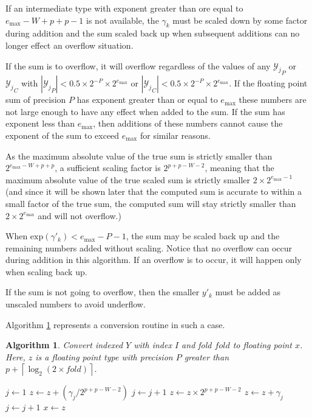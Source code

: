 \documentclass[12pt]{article}
\providecommand{\ceil}[1]{\left \lceil #1 \right \rceil }
\providecommand{\exp}{\ensuremath{\text{exp}}}
\providecommand{\max}{\ensuremath{\text{max}}}
\theoremstyle{plain}
\newtheorem{alg}{Algorithm}[section]
\begin{document}
    If an intermediate type with exponent greater than ore equal to $e_{\max} - W + p + p - 1$ is not available, the $\gamma_k$ must be scaled down by some factor during addition and the sum scaled back up when subsequent additions can no longer effect an overflow situation.

    If the sum is to overflow, it will overflow regardless of the values of any ${\mathcal{Y}_j}_P$ or ${\mathcal{Y}_j}_C$ with $|{\mathcal{Y}_j}_P| < 0.5 \times 2^{-P} \times 2^{e_{\max}}$ or $|{\mathcal{Y}_j}_C| < 0.5 \times 2^{-P} \times 2^{e_{\max}}$. If the floating point sum of precision $P$ has exponent greater than or equal to $e_{\max}$ these numbers are not large enough to have any effect when added to the sum. If the sum has exponent less than $e_{\max}$, then additions of these numbers cannot cause the exponent of the sum to exceed $e_{\max}$ for similar reasons.

    As the maximum absolute value of the true sum is strictly smaller than $2^{e_{\max} - W + p + p}$, a sufficient scaling factor is $2^{p + p - W - 2}$, meaning that the maximum absolute value of the true scaled sum is strictly smaller $2 \times 2^{e_{\max} - 1}$ (and since it will be shown later that the computed sum is accurate to within a small factor of the true sum, the computed sum will stay strictly smaller than $2 \times 2^{e_{\max}}$ and will not overflow.)

  When $\exp(\gamma'_k) < e_{\max} - P - 1$, the sum may be scaled back up and the remaining numbers added without scaling. Notice that no overflow can occur during addition in this algorithm. If an overflow is to occur, it will happen only when scaling back up.

    If the sum is not going to overflow, then the smaller $y'_k$ must be added as unscaled numbers to avoid underflow.

    Algorithm \ref{alg:conv2floatoverflow} represents a conversion routine in such a case.

    \begin{alg}
      Convert indexed $Y$ with index $I$ and fold $fold$ to floating point $x$. Here, $z$ is a floating point type with precision $P$ greater than $p + \ceil{\log_2(2 \times fold)}$.
      \begin{algorithmic}
          \State $j \gets 1$
          \While{$j \leq 2 \times fold$ and $\exp(\gamma_j) \geq e_{\max} - P - 1$}
            \State $z \gets z + (\gamma_j / 2^{p + p - W - 2})$
            \State $j \gets j + 1$
          \EndWhile
          \State $z \gets z \times 2^{p + p - W - 2}$
            \State $z \gets z + \gamma_j$
            \State $j \gets j + 1$
          \EndWhile
          \State $x \gets z$
        \EndFunction
      \end{algorithmic}
      \label{alg:conv2floatoverflow}
    \end{alg}
\end{document}
